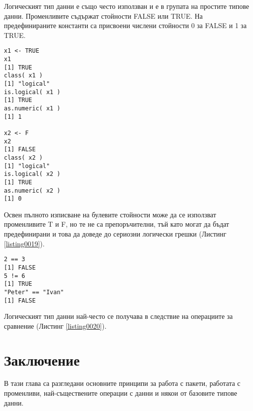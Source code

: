 Логическият тип данни е също често използван и е в групата на простите типове данни. Променливите съдържат стойности FALSE или TRUE. На предефинираните константи са присвоени числени стойности 0 за FALSE и 1 за TRUE. 

\begin{lstlisting}[caption=Логически тип данни, label=listing0019]
x1 <- TRUE
x1
[1] TRUE
class( x1 )
[1] "logical"
is.logical( x1 )
[1] TRUE
as.numeric( x1 )
[1] 1

x2 <- F
x2
[1] FALSE
class( x2 )
[1] "logical"
is.logical( x2 )
[1] TRUE
as.numeric( x2 )
[1] 0
\end{lstlisting}

Освен пълното изписване на булевите стойности може да се използват променливите T и F, но те не са препоръчителни, тъй като могат да бъдат предефинирани и това да доведе до сериозни логически грешки (Листинг \ref{listing0019}). 

\begin{lstlisting}[caption=Операции за сравнение, label=listing0020]
2 == 3
[1] FALSE
5 != 6
[1] TRUE
"Peter" == "Ivan"
[1] FALSE
\end{lstlisting}

Логическият тип данни най-често се получава в следствие на операциите за сравнение (Листинг \ref{listing0020}).

\section*{Заключение}

В тази глава са разгледани основните принципи за работа с пакети, работата с променливи, най-съществените операции с данни и някои от базовите типове данни. 
